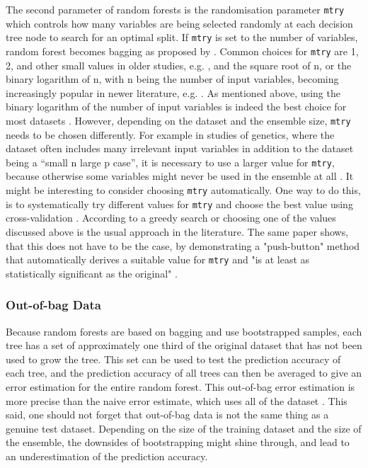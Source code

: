 \documentclass[a4paper,man,12pt,apacite,floatsintext,draftfirst]{apa6} %
\begin{document}
The second parameter of random forests is the randomisation parameter
\texttt{mtry} which controls how many variables are being selected randomly
at each decision tree node to search for an optimal split.
If \texttt{mtry} is set to the number of variables, random forest becomes
bagging as proposed by .
Common choices for \texttt{mtry} are 1, 2, and other small values in
older studies, e.g. , and the square root of n,
or the binary logarithm of n, with n being the number of input variables,
becoming increasingly popular in newer literature, e.g.
.
As mentioned above, using the binary logarithm of the number of
input variables is indeed the best choice for most datasets
\cite{banfield2007comparison}.
However, depending on the dataset and the ensemble size, \texttt{mtry}
needs to be chosen differently.
For example in studies of genetics, where the dataset often includes many
irrelevant input variables in addition to the dataset being a
“small n large p case”, it is necessary to use a larger value
for \texttt{mtry}, because otherwise some variables might never be used in the ensemble
at all \cite{strobl2009introduction}.
It might be interesting to consider choosing \texttt{mtry} automatically.
One way to do this, is to systematically try different values for \texttt{mtry}
and choose the best value using cross-validation \cite{psymeth}.
According to  a greedy search or choosing one of
the values discussed above is the usual approach in the literature.
The same paper shows, that this does not have to be the case, by demonstrating
a "push-button" method that automatically derives a suitable value for
\texttt{mtry} and "is at least as statistically significant as the original"
\cite{bernard2008forest}.

\subsubsection{Out-of-bag Data}
Because random forests are based on bagging and use bootstrapped samples,
each tree has a set of approximately one third of the original dataset
that has not been used to grow the tree.
This set can be used to test the prediction accuracy of each tree,
and the prediction accuracy of all trees can then be averaged to give an
error estimation for the entire random forest.
This out-of-bag error estimation is more precise than the naive error
estimate, which uses all of the dataset \cite{strobl2009introduction}.
This said, one should not forget that out-of-bag data is not the
same thing as a genuine test dataset.
Depending on the size of the training dataset and the size of the ensemble,
the downsides
of bootstrapping might shine through, and lead to an underestimation of
the prediction accuracy.
\end{document}
